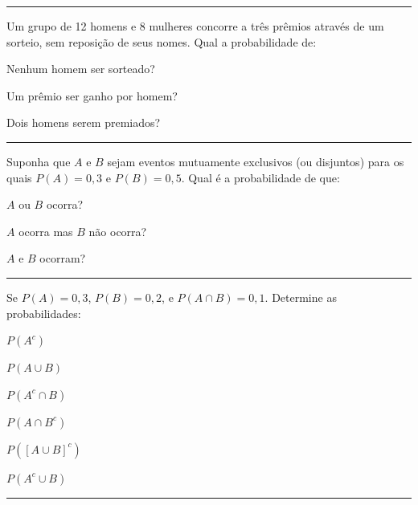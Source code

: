 \documentclass[a4paper,11pt,fleqn]{article}\usepackage[]{graphicx}\usepackage[]{color}
\theoremstyle{definition}
\begin{document}
\begin{compactenum}
\vspace{0.3cm}
\hrule
\vspace{0.3cm}

\item Um grupo de 12 homens e 8 mulheres concorre a três prêmios através
  de um sorteio, sem reposição de seus nomes. Qual a probabilidade de:
  \begin{compactenum}
  \item Nenhum homem ser sorteado?
  \item Um prêmio ser ganho por homem?
  \item Dois homens serem premiados?
  \end{compactenum}

\vspace{0.3cm}
\hrule
\vspace{0.3cm}

\item Suponha que $A$ e $B$ sejam eventos mutuamente exclusivos (ou
  disjuntos) para os quais $P(A) = 0,3$ e $P(B) = 0,5$. Qual é a
  probabilidade de que:
  \begin{compactenum}
  \item $A$ ou $B$ ocorra?
  \item $A$ ocorra mas $B$ não ocorra?
  \item $A$ e $B$ ocorram?
  \end{compactenum}

\vspace{0.3cm}
\hrule
\vspace{0.3cm}

\item Se $P(A) = 0,3$, $P(B) = 0,2$, e $P(A \cap B) = 0,1$. Determine as
  probabilidades: \\
    \begin{inparaenum}
    \item $P(A^c)$ \,
    \item $P(A \cup B)$ \,
    \item $P(A^c \cap B)$ \,
    \item $P(A \cap B^c)$ \,
    \item $P([A \cup B]^c)$ \,
    \item $P(A^c \cup B)$
    \end{inparaenum}

\vspace{0.3cm}
\hrule
\vspace{0.3cm}


\end{compactenum}
\end{document}
